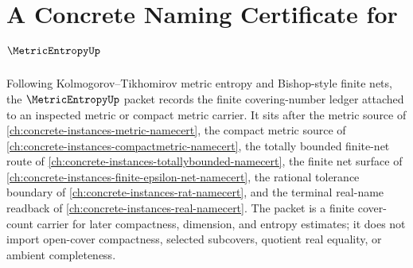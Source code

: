 \chapter{A Concrete Naming Certificate for $\MetricEntropyUp$}
\label{ch:concrete-instances-metric-entropy-namecert}

Following Kolmogorov--Tikhomirov metric entropy and Bishop-style finite nets, the $\MetricEntropyUp$ packet records the finite covering-number ledger attached to an inspected metric or compact metric carrier. It sits after the metric source of \autoref{ch:concrete-instances-metric-namecert}, the compact metric source of \autoref{ch:concrete-instances-compactmetric-namecert}, the totally bounded finite-net route of \autoref{ch:concrete-instances-totallybounded-namecert}, the finite net surface of \autoref{ch:concrete-instances-finite-epsilon-net-namecert}, the rational tolerance boundary of \autoref{ch:concrete-instances-rat-namecert}, and the terminal real-name readback of \autoref{ch:concrete-instances-real-namecert}. The packet is a finite cover-count carrier for later compactness, dimension, and entropy estimates; it does not import open-cover compactness, selected subcovers, quotient real equality, or ambient completeness.

